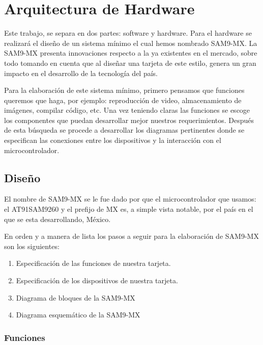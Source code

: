 \chapter{Arquitectura de Hardware}\label{ch:tarjeta}

Este trabajo, se separa en dos partes: software y hardware. Para el
hardware se realizará el diseño de un sistema mínimo el cual hemos nombrado \ac{SAM}9-MX.
La \ac{SAM}9-MX presenta innovaciones respecto a la ya existentes
en el mercado, sobre todo tomando en cuenta que al diseñar una tarjeta
de este estilo, genera un gran impacto en el desarrollo de la tecnología
del país.

Para la elaboración de este sistema mínimo, primero pensamos que funciones
queremos que haga, por ejemplo: reproducción de video, almacenamiento
de imágenes, compilar código, etc. Una vez teniendo claras las funciones
se escoge los componentes que puedan desarrollar mejor nuestros requerimientos.
Después de esta búsqueda se procede a desarrollar los diagramas pertinentes
donde se especifican las conexiones entre los dispositivos y la interacción
con el microcontrolador.

\pagebreak{}

\section{Dise\~no}

El nombre de \ac{SAM}9-MX se le fue dado por que el microcontrolador
que usamos: el AT91SAM9260 y el prefijo de MX es, a simple vista notable,
por el país en el que se esta desarrollando, México.

En orden y a manera de lista los pasos a seguir para la elaboración
de \ac{SAM}9-MX son los siguientes:
\begin{enumerate}
\item Especificación de las funciones de nuestra tarjeta.
\item Especificación de los dispositivos de nuestra tarjeta.
\item Diagrama de bloques de la \ac{SAM}9-MX 
\item Diagrama esquem\'{a}tico de la \ac{SAM}9-MX 
\end{enumerate}

\subsection{Funciones}

